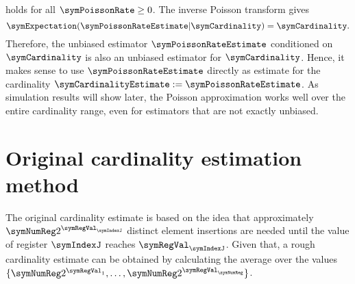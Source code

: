 \documentclass[a4paper]{scrartcl}
\begin{document}
holds for all $\symPoissonRate\geq0$. The inverse Poisson transform gives
\begin{equation}
\symExpectation(\symPoissonRateEstimate\vert\symCardinality) = \symCardinality.
\end{equation}
Therefore, the unbiased estimator $\symPoissonRateEstimate$ conditioned on $\symCardinality$ is also an unbiased estimator for $\symCardinality$. Hence, it makes sense to use $\symPoissonRateEstimate$ directly as estimate for the cardinality $\symCardinalityEstimate := \symPoissonRateEstimate$. As simulation results will show later, the Poisson approximation works well over the entire cardinality range, even for estimators that are not exactly unbiased.

\section{Original cardinality estimation method}
\label{sec:cardinality_estimation}
The original cardinality estimate \cite{Flajolet2007} is based on the idea that approximately $\symNumReg  2^{\symRegVal_\symIndexJ}$ distinct element insertions are needed until the value of register $\symIndexJ$ reaches $\symRegVal_\symIndexJ$. Given that, a rough cardinality estimate can be obtained by calculating the average over the values $\lbrace \symNumReg 2^{\symRegVal_1},\ldots,\symNumReg2^{\symRegVal_\symNumReg}\rbrace$. 
\end{document}
